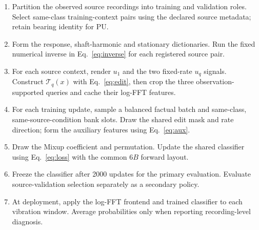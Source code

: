 \begin{table}[pos=htbp]
\caption{Source preparation, learning and deployment procedure.}
\label{tab:algorithm}
\begin{minipage}{.98\linewidth}\small
\begin{enumerate}
\item Partition the observed source recordings into training and validation
roles. Select same-class training-context pairs using the declared source
metadata; retain bearing identity for PU.
\item Form the response, shaft-harmonic and stationary dictionaries. Run the
fixed numerical inverse in Eq.~\eqref{eq:inverse} for each registered source pair.
\item For each source context, render $u_1$ and the two fixed-rate $u_q$ signals.
Construct $\mathcal T_q(x)$ with Eq.~\eqref{eq:edit}, then crop the three
observation-supported queries and cache their log-FFT features.
\item For each training update, sample a balanced factual batch and same-class,
same-source-condition bank slots. Draw the shared edit mask and rate direction;
form the auxiliary features using Eq.~\eqref{eq:aux}.
\item Draw the Mixup coefficient and permutation. Update the shared classifier
using Eq.~\eqref{eq:loss} with the common $6B$ forward layout.
\item Freeze the classifier after 2000 updates for the primary evaluation.
Evaluate source-validation selection separately as a secondary policy.
\item At deployment, apply the log-FFT frontend and trained classifier to each
vibration window. Average probabilities only when reporting recording-level
diagnosis.
\end{enumerate}
\end{minipage}
\end{table}
